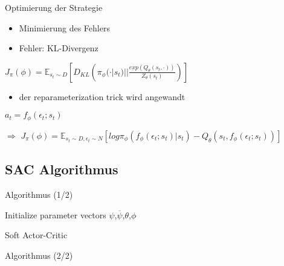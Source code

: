 \begin{frame}{Optimierung der Strategie}
\begin{itemize}
\item Minimierung des Fehlers
\item Fehler: KL-Divergenz
\end{itemize}
$J_{\pi}(\phi)=\mathbb{E}_{s_{t}\sim D}\left[D_{KL}\left(\pi_{\phi}(\cdot | s_{t})||\frac{exp(Q_{\theta}(s_{t},\cdot))}{Z_{\theta}(s_{t})}\right)\right]$
\begin{itemize}
\item der reparameterization trick wird angewandt
\end{itemize}
$a_{t}=f_{\phi}(\epsilon_{t};s_{t})$

$\Rightarrow$
$J_{\pi}(\phi)=\mathbb{E}_{s_{t}\sim D,\epsilon_{t}\sim N}\left[log\pi_{\phi}(f_{\phi}(\epsilon_{t};s_{t})|s_{t})-Q_{\theta}(s_{t},f_{\phi}(\epsilon_{t};s_{t}))\right]$
\end{frame}

\subsection{SAC Algorithmus}

\begin{frame}{Algorithmus (1/2)}
\begin{algorithm}[H]
{\small
\SetAlgoLined
Initialize parameter vectors $\psi$,$\overline{\psi}$,$\theta$,$\phi$\\
}
 \caption{Soft Actor-Critic}
\end{algorithm}
\end{frame}

\begin{frame}{Algorithmus (2/2)}

\end{frame}






